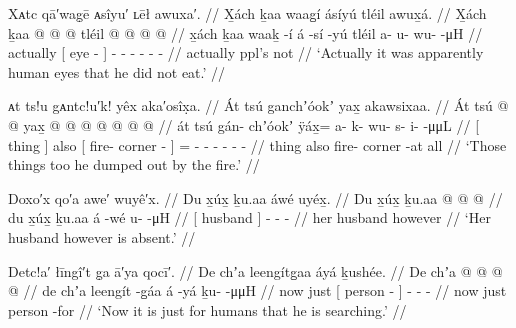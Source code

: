 \ex\label{ex:91-260-didnt-eat-human-eyes}%
%
\begingl
	\glpreamble	Xᴀtc qā′wag̣ē ᴀsîyu′ ʟēł awuxa′. //
	\glpreamble	X̱ách ḵaa waag̱í ásíyú tléil awux̱á. //
	\gla	X̱ách {} ḵaa  @ {} {}  @ {} @ {}
		tléil  @ {} @ {} @ {} @ {} //
	\glb	x̱ách {} ḵaa waaḵ -í {} á -sí -yú
		tléil a- u- wu-  -μH //
	\glc	actually {}[  eye - {}]  - -
		 - - -  - //
	\gld	actually {} ppl’s  {} {}  {} {}
		not  {} {} {} {} //
	\glft	‘Actually it was apparently human eyes that he did not eat.’
		//
\endgl
\xe

\ex\label{ex:91-261-pour-out-by-fire}%
%
\begingl
	\glpreamble	ᴀt ts!u gᴀntc!u′k! yêx aka′osîx̣a. //
	\glpreamble	Át tsú ganchʼóokʼ yax̱ akawsixaa. //
	\gla	{} Át {} tsú {}  @ {} @ {} {}
		yax̱ @  @ {} @ {} @ {} @ {} @ {} @ {} //
	\glb	{} át {} tsú {} gán- chʼóokʼ {} {}
		ÿáx̱= a- k- wu- s- i-  -μμL //
	\glc	{}[ thing {}] also {}[ fire- corner - {}]
		= - - - - -
			 - //
	\gld	{} thing {} also {} fire- corner -at {}
		all  {} {} {} {} {} {} //
	\glft	‘Those things too he dumped out by the fire.’
		//
\endgl
\xe

\ex\label{ex:91-262-husband-absent}%
%
\begingl
	\glpreamble	Doxo′x qo′a awe′ wuyê′x. //
	\glpreamble	Du x̱úx̱ ḵu.aa áwé uyéx̱. //
	\gla	{} Du x̱úx̱ {} ḵu.aa  @ {}  @ {} @ {} //
	\glb	{} du x̱úx̱ {} ḵu.aa á -wé u-  -μH //
	\glc	{}[  husband {}]   -
		-  - //
	\gld	{} her husband {} however  {}
		 {} {} //
	\glft	‘Her husband however is absent.’
		//
\endgl
\xe

\ex\label{ex:91-263-search-for-humans}%
%
\begingl
	\glpreamble	Detc!a′ łīngî′t g̣a ā′ya qocī′. //
	\glpreamble	De chʼa leengítg̱aa áyá ḵushée. //
	\gla	De chʼa {}  @ {} {}  @ {}
		 @ {} @ {} //
	\glb	de chʼa {} leengít -g̱áa {} á -yá
		ḵu-  -μμH //
	\glc	now just {}[ person - {}]  -
		-  - //
	\gld	now just {} person -for {}  {}
		 {} {} //
	\glft	‘Now it is just for humans that he is searching.’
		//
\endgl
\xe

